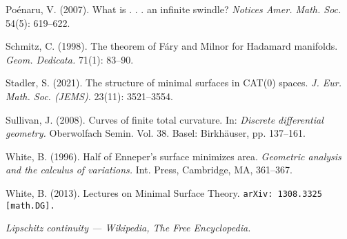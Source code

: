 \documentclass{article}
\theoremstyle{theorem}
\newtheorem{Crofton-type formula}[theorem]{Crofton-type formula}
\newtheorem{Douglas--Rado theorem}[theorem]{\arXiv{Douglas--Rado theorem}{Theorem}}
\newtheorem{Extended monotonicity theorem}[theorem]{\arXiv{Extended monotonicity theorem}{Theorem}}
\theoremstyle{definition}
\begin{document}
\begin{thebibliography}{2}
\!\!\!Poénaru, V. 
(2007).
What is . . . an infinite swindle?
\textit{Notices Amer. Math. Soc.} 54(5): 619--622.


\!\!\!Schmitz, C. 
(1998).
The theorem of Fáry and Milnor for Hadamard manifolds.
\textit{Geom. Dedicata.}
71(1): 83--90.


\!\!\!Stadler, S. 
(2021).
The structure of minimal surfaces in CAT(0) spaces.
\textit{J. Eur. Math. Soc. (JEMS).}
23(11): 3521--3554.


\!\!\!Sullivan, J. (2008).
Curves of finite total curvature.
In:
\textit{Discrete differential geometry.} Oberwolfach
Semin. Vol. 38. 
Basel:
Birkh\"{a}user,
pp. 137--161.


\!\!\!White, B.
(1996).
Half of Enneper’s surface minimizes area.
\textit{Geometric analysis and the calculus
of variations.} Int. Press, Cambridge, MA, 361--367.


\!\!\!White, B. (2013). Lectures on Minimal Surface Theory. \texttt{arXiv: 1308.3325 [math.DG].}


\!\!\!\textit{Lipschitz continuity — Wikipedia, The Free Encyclopedia.}


\end{thebibliography}
\end{document}
